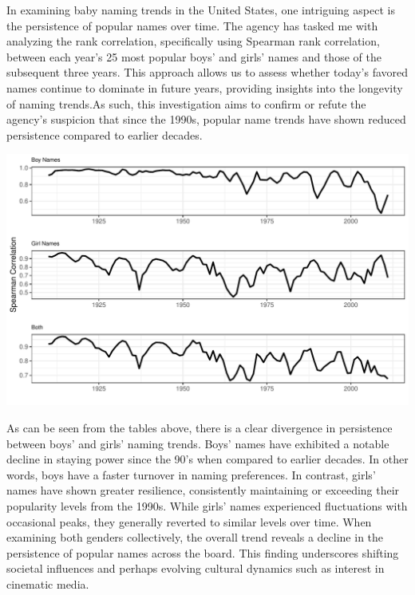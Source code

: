 \documentclass[11pt,preprint, authoryear]{elsarticle}
\let\origfigure\figure
\let\endorigfigure\endfigure
\renewenvironment{figure}[1][2] {
    \expandafter\origfigure\expandafter[H]
} {
    \endorigfigure
}
\numberwithin{equation}{section}
\numberwithin{figure}{section}
\numberwithin{table}{section}
\begin{document}
In examining baby naming trends in the United States, one intriguing
aspect is the persistence of popular names over time. The agency has
tasked me with analyzing the rank correlation, specifically using
Spearman rank correlation, between each year's 25 most popular boys' and
girls' names and those of the subsequent three years. This approach
allows us to assess whether today's favored names continue to dominate
in future years, providing insights into the longevity of naming
trends.As such, this investigation aims to confirm or refute the
agency's suspicion that since the 1990s, popular name trends have shown
reduced persistence compared to earlier decades.

\begin{figure}[H]

{\centering \includegraphics{Question1_files/figure-latex/unnamed-chunk-1-1}

}

\caption{Spearman Correlations Over Time.\label{Figure1}}\label{fig:unnamed-chunk-1}
\end{figure}
\hfill

As can be seen from the tables above, there is a clear divergence in
persistence between boys' and girls' naming trends. Boys' names have
exhibited a notable decline in staying power since the 90's when
compared to earlier decades. In other words, boys have a faster turnover
in naming preferences. In contrast, girls' names have shown greater
resilience, consistently maintaining or exceeding their popularity
levels from the 1990s. While girls' names experienced fluctuations with
occasional peaks, they generally reverted to similar levels over time.
When examining both genders collectively, the overall trend reveals a
decline in the persistence of popular names across the board. This
finding underscores shifting societal influences and perhaps evolving
cultural dynamics such as interest in cinematic media.
\end{document}
